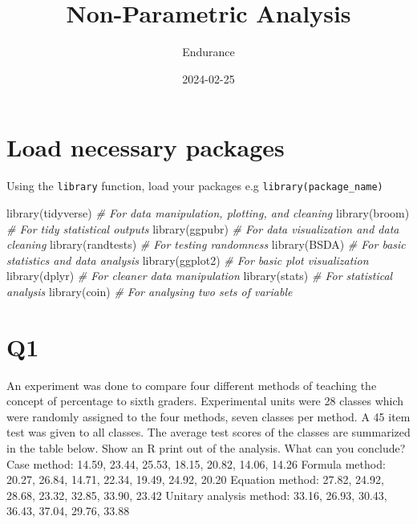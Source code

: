 \documentclass[
]{article}
\title{Non-Parametric Analysis}
\author{Endurance}
\date{2024-02-25}
\newenvironment{Shaded}{\begin{snugshade}}{\end{snugshade}}
\newcommand{\CommentTok}[1]{\textcolor[rgb]{0.56,0.35,0.01}{\textit{#1}}}
\newcommand{\FunctionTok}[1]{\textcolor[rgb]{0.00,0.00,0.00}{#1}}
\newcommand{\NormalTok}[1]{#1}
\begin{document}
\maketitle

\hypertarget{load-necessary-packages}{%
\section{Load necessary packages}\label{load-necessary-packages}}

Using the \texttt{library} function, load your packages e.g
\texttt{library(package\_name)}

\begin{Shaded}
\begin{Highlighting}[]
\FunctionTok{library}\NormalTok{(tidyverse)   }\CommentTok{\# For data manipulation, plotting, and cleaning}
\FunctionTok{library}\NormalTok{(broom)       }\CommentTok{\# For tidy statistical outputs}
\FunctionTok{library}\NormalTok{(ggpubr)      }\CommentTok{\# For data visualization and data cleaning}
\FunctionTok{library}\NormalTok{(randtests)   }\CommentTok{\# For testing randomness}
\FunctionTok{library}\NormalTok{(BSDA)        }\CommentTok{\# For basic statistics and data analysis}
\FunctionTok{library}\NormalTok{(ggplot2)     }\CommentTok{\# For basic plot visualization}
\FunctionTok{library}\NormalTok{(dplyr)       }\CommentTok{\# For cleaner data manipulation}
\FunctionTok{library}\NormalTok{(stats)       }\CommentTok{\# For statistical analysis}
\FunctionTok{library}\NormalTok{(coin)        }\CommentTok{\# For analysing two sets of variable}
\end{Highlighting}
\end{Shaded}

\hypertarget{q1}{%
\section{Q1}\label{q1}}

An experiment was done to compare four different methods of teaching the
concept of percentage to sixth graders. Experimental units were 28
classes which were randomly assigned to the four methods, seven classes
per method. A 45 item test was given to all classes. The average test
scores of the classes are summarized in the table below. Show an R print
out of the analysis. What can you conclude? Case method: 14.59, 23.44,
25.53, 18.15, 20.82, 14.06, 14.26 Formula method: 20.27, 26.84, 14.71,
22.34, 19.49, 24.92, 20.20 Equation method: 27.82, 24.92, 28.68, 23.32,
32.85, 33.90, 23.42 Unitary analysis method: 33.16, 26.93, 30.43, 36.43,
37.04, 29.76, 33.88
\end{document}
